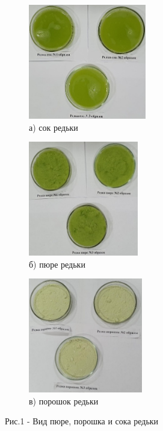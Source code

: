 \begin{figure}[H]
	\centering
	\begin{subfigure}{0.3\textwidth}
		\centering
		\includegraphics[height=5cm, width=\textwidth, keepaspectratio]{media/pish/image58}
		\caption*{а) сок редьки}
	\end{subfigure}
	\hfill
	\begin{subfigure}{0.3\textwidth}
		\centering
		\includegraphics[height=5cm, width=\textwidth, keepaspectratio]{media/pish/image59}
		\caption*{б) пюре редьки}
	\end{subfigure}
	\hfill
	\begin{subfigure}{0.3\textwidth}
		\centering
		\includegraphics[height=5cm, width=\textwidth, keepaspectratio]{media/pish/image60}
		\caption*{в) порошок редьки}
	\end{subfigure}
	\caption*{Рис.1 - Вид пюре, порошка и сока редьки}
\end{figure}

